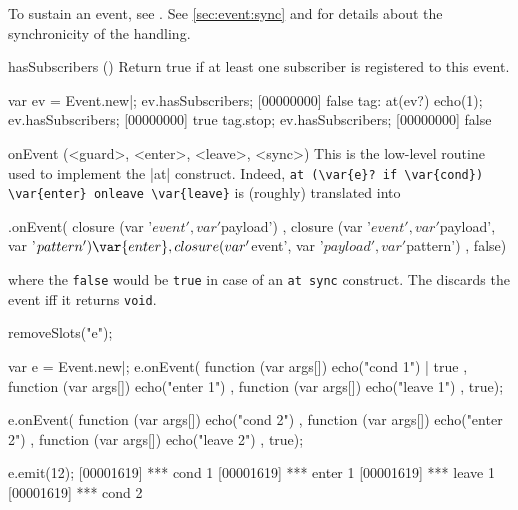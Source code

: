 \begin{urbiscriptapi}
To sustain an event, see .  See \autoref{sec:event:sync}
and  for details about the synchronicity of the handling.


\item[hasSubscribers]()%
  Return true if at least one subscriber is registered to this event.

\begin{urbiscript}
var ev = Event.new|;
ev.hasSubscribers;
[00000000] false
tag: at(ev?) echo(1);
ev.hasSubscribers;
[00000000] true
tag.stop;
ev.hasSubscribers;
[00000000] false
\end{urbiscript}

\item[onEvent](<guard>, <enter>, <leave>, <sync>)%
  This is the low-level routine used to implement the \lstindex|at|
  construct.  Indeed,
  \lstinline|at (\var{e}? if \var{cond}) \var{enter} onleave \var{leave}|
  is (roughly) translated into
\begin{urbiunchecked}
  .onEvent(
    closure (var '$event', var '$payload')                 {   },
    closure (var '$event', var '$payload', var '$pattern') { \var{enter} },
    closure (var '$event', var '$payload', var '$pattern') {  },
    false)
\end{urbiunchecked}

\noindent
where the \lstinline|false| would be \lstinline|true| in case of an
\lstinline|at sync| construct.  The  discards the event iff it
returns \lstinline{void}.

\begin{urbicomment}
removeSlots("e");
\end{urbicomment}
\begin{urbiscript}
var e = Event.new|;
e.onEvent(
  function (var args[]) { echo("cond 1") | true },
  function (var args[]) { echo("enter 1") },
  function (var args[]) { echo("leave 1") },
  true);

e.onEvent(
  function (var args[]) { echo("cond 2") },
  function (var args[]) { echo("enter 2") },
  function (var args[]) { echo("leave 2") },
  true);

e.emit(12);
[00001619] *** cond 1
[00001619] *** enter 1
[00001619] *** leave 1
[00001619] *** cond 2


\end{urbiscript}
\end{urbiscriptapi}
